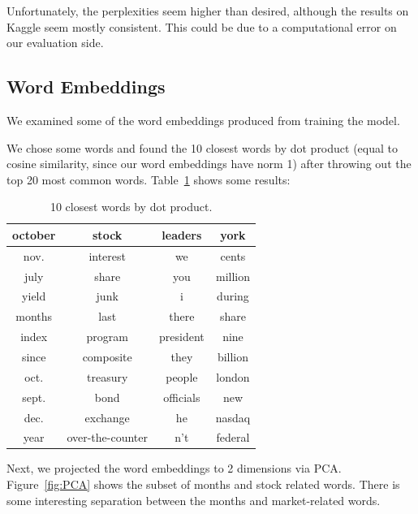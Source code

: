 \documentclass[11pt]{article}
\begin{document}

Unfortunately, the perplexities seem higher than desired, although the results on Kaggle seem mostly consistent. This could be due to a computational error on our evaluation side.

\subsection{Word Embeddings}

We examined some of the word embeddings produced from training the model. 

We chose some words and found the 10 closest words by dot product (equal to cosine similarity, since our word embeddings have norm 1) after throwing out the top 20 most common words. Table~\ref{tab:close} shows some results:

\begin{table}[h]
  \centering
  \begin{tabular}{c|c|c|c}
    october & stock & leaders & york  \\
    \midrule
nov. & interest & we & cents \\
july & share & you & million \\
yield & junk & i & during \\
months & last & there & share \\
index & program & president  & nine \\
since & composite & they & billion \\
oct. & treasury & people & london \\
sept. & bond & officials & new \\ 
dec. & exchange & he & nasdaq \\
year & over-the-counter & n't & federal
  \end{tabular}
  \caption{10 closest words by dot product.}\label{tab:close} 
\end{table}

Next, we projected the word embeddings to 2 dimensions via PCA. Figure~\ref{fig:PCA} shows the subset of months and stock related words. There is some interesting separation between the months and market-related words.
\end{document}
